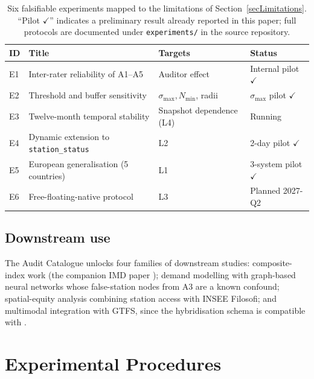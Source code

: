 \documentclass[11pt,a4paper]{article}
\begin{document}
\begin{table}[ht]
\centering
\caption{Six falsifiable experiments mapped to the limitations of
Section~\ref{secLimitations}. ``Pilot $\checkmark$'' indicates a
preliminary result already reported in this paper; full protocols are
documented under \texttt{experiments/} in the source repository.}
\label{tab:roadmap}
\small
\begin{tabular}{@{}llll@{}}
\toprule
\textbf{ID} & \textbf{Title} & \textbf{Targets} & \textbf{Status}\\
\midrule
E1 & Inter-rater reliability of A1--A5         & Auditor effect             & Internal pilot $\checkmark$ \\
E2 & Threshold and buffer sensitivity           & $\sigma_{\max}, N_{\min}$, radii & $\sigma_{\max}$ pilot $\checkmark$ \\
E3 & Twelve-month temporal stability            & Snapshot dependence (L4)    & Running \\
E4 & Dynamic extension to \texttt{station\_status} & L2                       & 2-day pilot $\checkmark$ \\
E5 & European generalisation (5 countries)      & L1                          & 3-system pilot $\checkmark$ \\
E6 & Free-floating-native protocol              & L3                          & Planned 2027-Q2 \\
\bottomrule
\end{tabular}
\end{table}

\subsection{Downstream use}
The Audit Catalogue unlocks four families of downstream studies:
composite-index work (the companion IMD paper \cite{Fosse2026imd});
demand modelling with graph-based neural networks
\cite{Lin2018BSSGraph} whose false-station nodes from A3 are a known
confound; spatial-equity analysis combining station access with INSEE
Filosofi; and multimodal integration with GTFS, since the
hybridisation schema is compatible with
\cite{MobilityData2024Validator}.

\section{Experimental Procedures}\label{secMethods}
\end{document}
